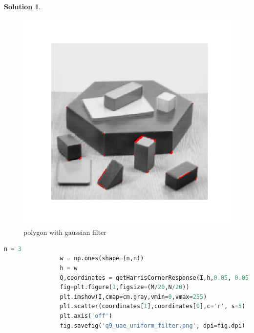 \documentclass[11pt]{article}
\theoremstyle{plain}
\theoremstyle{definition}
\newtheorem{solution}{Solution}
\theoremstyle{remark}
\begin{document}
\begin{solution}
\begin{enumerate}
			\begin{figure}[h]
				\centering
				\includegraphics[width=\textwidth]{q9_polygons_gaussian_filter.png}
				\caption{polygon with gaussian filter}
			\end{figure}
			
			\begin{lstlisting}[language=Python, caption=grand mosque with uniform filter]
				n = 3
				w = np.ones(shape=(n,n))
				h = w
				Q,coordinates = getHarrisCornerResponse(I,h,0.05, 0.05)
				fig=plt.figure(1,figsize=(M/20,N/20))
				plt.imshow(I,cmap=cm.gray,vmin=0,vmax=255)
				plt.scatter(coordinates[1],coordinates[0],c='r', s=5)
				plt.axis('off')
				fig.savefig('q9_uae_uniform_filter.png', dpi=fig.dpi)
			\end{lstlisting}
			

\end{enumerate}
\end{solution}
\end{document}
